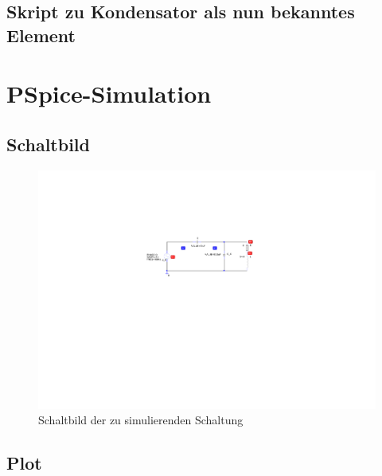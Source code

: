 \documentclass[11pt]{scrartcl}
\begin{document}
\subsection{Skript zu Kondensator als nun bekanntes Element}
\label{sec:skript-zu-kond-1}


\newpage
\section{PSpice-Simulation}
\label{sec:pspice-simulation}

\subsection{Schaltbild}
\label{sec:schaltbild}

\begin{figure}[!htb]
    \begin{center}
      \includegraphics[width=0.9\linewidth]{./Assets/PS_Schaltplan.pdf}
    \caption{Schaltbild der zu simulierenden Schaltung}
    \label{fig:schaltbild}
  \end{center}
\end{figure}


\subsection{Plot}
\label{sec:plot}
\end{document}

